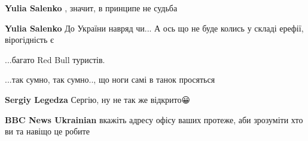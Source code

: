 \begin{itemize}
\begin{itemize}
\textbf{Yulia Salenko} , значит, в принципе не судьба

 
\textbf{Yulia Salenko} До України навряд чи... А ось що не буде колись у складі ерефії, вірогідність є
\end{itemize}

 
...багато Red Bull туристів.

 
...так сумно, так сумно.., що ноги самі в танок просяться🤣

\begin{itemize}
 
\textbf{Sergiy Legedza} Сергію, ну не так же відкрито😀
\end{itemize}

 
\textbf{BBC News Ukrainian} вкажіть адресу офісу ваших протеже, аби зрозуміти хто ви та навіщо це робите

 

\end{itemize}
